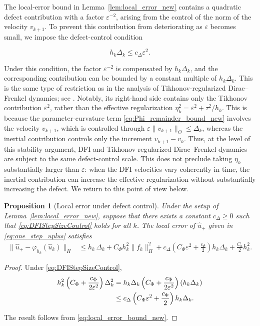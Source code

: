 \documentclass[oneside,11pt]{article}
\newtheorem{proposition}{Proposition}
\theoremstyle{remark}
\theoremstyle{thmstyleone}
\theoremstyle{thmstylethree}
\theoremstyle{thmstyletwo}
\newcommand{\norm}[1]{\lVert #1\rVert}
\newcommand{\tc}[1]{#1}
\begin{document}
\tc{
The local-error bound in Lemma~\ref{lem:local_error_new} contains a quadratic defect contribution with a factor $\varepsilon^{-2}$, arising from the control of the norm of the velocity $v_{k+1}$.
To prevent this contribution from deteriorating as $\varepsilon$ becomes small, we impose the defect-control condition
}
\begin{equation}
  h_k\Delta_k\le c_\Delta\tc{\varepsilon^2}.
  \label{eq:DFIStepSizeControl}
\end{equation}
\tc{
Under this condition, the factor $\varepsilon^{-2}$ is compensated by $h_k\Delta_k$, and the corresponding contribution can be bounded by a constant multiple of $h_k\Delta_k$.
This is the same type of restriction as in the analysis of Tikhonov-regularized Dirac--Frenkel dynamics; see \cite{Feischl2024}.
Notably, its right-hand side contains only the Tikhonov contribution $\varepsilon^2$, rather than the effective regularization $\eta_k^2=\varepsilon^2+\tau^2/h_k$.
This is because the parameter-curvature term \eqref{eq:Phi_remainder_bound_new} involves the velocity $v_{k+1}$, which is controlled through $\varepsilon\norm{v_{k+1}}_\Theta\le\Delta_k$, whereas the inertial contribution controls only the increment $v_{k+1}-v_k$.
Thus, at the level of this stability argument, DFI and Tikhonov-regularized Dirac--Frenkel dynamics are subject to the same defect-control scale.
This does not preclude taking $\eta_k$ substantially larger than $\varepsilon$: when the DFI velocities vary coherently in time, the inertial contribution can increase the effective regularization without substantially increasing the defect.
We return to this point of view below.
}
\begin{proposition}[Local error under defect control]
  \label{prop:local_error_defect_control_new}
  Under the setup of Lemma~\ref{lem:local_error_new}, suppose that there exists a constant $c_\Delta\ge0$ such that \eqref{eq:DFIStepSizeControl} holds for all $k$.
  The local error of $\hat{u}_+$ given in \eqref{eq:one_step_uplus} satisfies
  \begin{align}
    \norm{\hat u_+-\varphi_{h_k}(\hat u_k)}_H
     & \le
    h_k\,\Delta_k
    +
    C_\Phi h_k^2\norm{f_k}_H^2
    +
    \tc{
    c_\Delta
    \left(
    C_\Phi\varepsilon^2+\frac{c_\Phi}{2}
    \right)h_k\Delta_k}
    +
    \frac{C_a}{2}h_k^2.
    \label{eq:defect_control_local_error_new}
  \end{align}
\end{proposition}
\begin{proof}
  \tc{
    Under \eqref{eq:DFIStepSizeControl},
    \begin{align}
      h_k^2
      \left(
      C_\Phi+\frac{c_\Phi}{2\varepsilon^2}
      \right)\Delta_k^2
       & =
      h_k\Delta_k
      \left(
      C_\Phi+\frac{c_\Phi}{2\varepsilon^2}
      \right)
      (h_k\Delta_k)
      \notag \\
       & \le
      c_\Delta
      \left(
      C_\Phi\varepsilon^2+\frac{c_\Phi}{2}
      \right)h_k\Delta_k.
    \end{align}
  }
  The result follows from \eqref{eq:local_error_bound_new}.
\end{proof}
\end{document}

